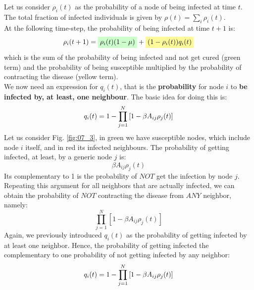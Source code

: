 \documentclass[../main/main.tex]{subfiles}
\begin{document}
Let us consider \( \rho _i (t) \) as the probability of a node of being infected at time \( t \). The total fraction of infected individuals is given by \( \rho (t) = \sum_{i}^{} \rho _i (t)   \).\\
At the following time-step, the probability of being infected at time \( t+1 \) is:
\begin{equation}
  \rho _i (t+1) = \mathcolorbox{green!20}{\rho _i(t) (1- \mu )} + \mathcolorbox{yellow!40}{(1 - \rho _i(t))q_i(t)}
\end{equation}
which is the sum of the probability of being infected and not get cured (green term) and the probability of being susceptible multiplied by the probability of contracting the disease (yellow term).\\
We now need an expression for \( q_i(t) \), that is the \textbf{probability} for node \( i \) to \textbf{be infected by, at least, one neighbour}. The basic idea for doing this is:
\begin{equation}
  q_i (t) = 1 - \prod_{j=1}^{N} \qty[1- \beta A_{ij} \rho _j (t)]
\end{equation}
Let us consider Fig. \ref{fig:07_3}, in green we have susceptible nodes, which include node \( i \) itself, and in red its infected neighbours.
The probability of getting infected, at least, by a generic node $j$ is:
\begin{equation}
   \beta A_{ij} \rho _j (t) 
\end{equation}
Its complementary to 1 is the probability of $NOT$ get the infection by node $j$.  
\begin{equation}
   [1- \beta A_{ij} \rho _j (t)] 
\end{equation}
Repeating this argument for all neighbors that are actually infected, we can obtain the probability of $NOT$ contracting the disease from $ANY$ neighbor, namely:
\begin{equation}
    \prod_{j=1}^{N} [1- \beta A_{ij} \rho _j (t)]
\end{equation}
Again, we previously introduced \(   q_i (t) \) as the probability of getting infected by at least one neighbor. Hence, the probability of getting infected the complementary to one probability of not getting infected by any neighbor:
\begin{equation}
  q_i (t) = 1 - \prod_{j=1}^{N} \qty[1- \beta A_{ij} \rho _j (t)]
\end{equation}
\end{document}
